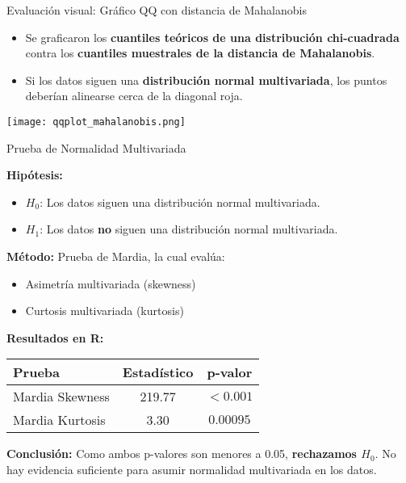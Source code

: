 \documentclass[
	11pt, %
]{beamer}
\begin{document}
\begin{frame}{Evaluación visual: Gráfico QQ con distancia de Mahalanobis}

\begin{itemize}
    \item Se graficaron los \textbf{cuantiles teóricos de una distribución chi-cuadrada} contra los \textbf{cuantiles muestrales de la distancia de Mahalanobis}.
    \item Si los datos siguen una \textbf{distribución normal multivariada}, los puntos deberían alinearse cerca de la diagonal roja.
    
\end{itemize}

\vspace{0.3cm}

\begin{center}
    \texttt{[image: qqplot\_mahalanobis.png]}
\end{center}

\end{frame}

\begin{frame}{Prueba de Normalidad Multivariada}

\textbf{Hipótesis:}
\begin{itemize}
    \item $H_0$: Los datos siguen una distribución normal multivariada.
    \item $H_1$: Los datos \textbf{no} siguen una distribución normal multivariada.
\end{itemize}

\textbf{Método:} Prueba de Mardia, la cual evalúa:
\begin{itemize}
    \item Asimetría multivariada (skewness)
    \item Curtosis multivariada (kurtosis)
\end{itemize}

\vspace{0.2cm}
\textbf{Resultados en R:}
\begin{table}[]
    \centering
    \begin{tabular}{lcc}
        \toprule
        \textbf{Prueba} & \textbf{Estadístico} & \textbf{p-valor} \\
        \midrule
        Mardia Skewness & 219.77 & $< 0.001$ \\
        Mardia Kurtosis & 3.30 & $0.00095$ \\
        \bottomrule
    \end{tabular}
\end{table}

\vspace{0.3cm}
\textbf{Conclusión:} Como ambos p-valores son menores a 0.05, \textbf{rechazamos $H_0$}. No hay evidencia suficiente para asumir normalidad multivariada en los datos.

\end{frame}
\end{document}
